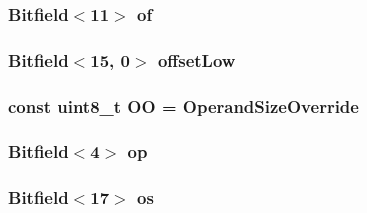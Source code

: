 \label{namespaceX86ISA_a764d126685695aef3fac5ded01176f77}
\hypertarget{namespaceX86ISA_a812166d5cea15560f9214ed7df90f800}{
\subsubsection[{of}]{\setlength{\rightskip}{0pt plus 5cm}Bitfield$<$11$>$ {\bf of}}}
\label{namespaceX86ISA_a812166d5cea15560f9214ed7df90f800}
\hypertarget{namespaceX86ISA_ac6047d8218946eabcf7d9a789fe03d7c}{
\subsubsection[{offsetHigh}]{}}
\label{namespaceX86ISA_ac6047d8218946eabcf7d9a789fe03d7c}
\hypertarget{namespaceX86ISA_aba42d08026276e11c74518f651744f33}{
\subsubsection[{offsetLow}]{\setlength{\rightskip}{0pt plus 5cm}Bitfield$<$15, 0$>$ {\bf offsetLow}}}
\label{namespaceX86ISA_aba42d08026276e11c74518f651744f33}
\hypertarget{namespaceX86ISA_aedb1e3f2b58889f97bb533d5c82981da}{
\subsubsection[{OO}]{\setlength{\rightskip}{0pt plus 5cm}const uint8\_\-t {\bf OO} = OperandSizeOverride}}
\label{namespaceX86ISA_aedb1e3f2b58889f97bb533d5c82981da}
\hypertarget{namespaceX86ISA_ac120faf051fe003563eb1b3ece78528c}{
\subsubsection[{op}]{\setlength{\rightskip}{0pt plus 5cm}Bitfield$<$4$>$ {\bf op}}}
\label{namespaceX86ISA_ac120faf051fe003563eb1b3ece78528c}
\hypertarget{namespaceX86ISA_a6b6e6ba763e7eaf46ac5b6372ca98d30}{
\subsubsection[{os}]{\setlength{\rightskip}{0pt plus 5cm}Bitfield$<$17$>$ {\bf os}}}
